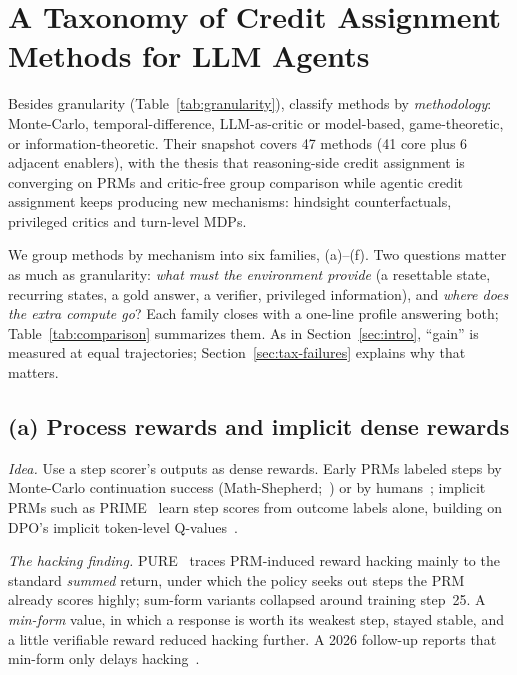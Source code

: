 \section{A Taxonomy of Credit Assignment Methods for LLM Agents}\label{sec:taxonomy}

Besides granularity (Table~\ref{tab:granularity}), \citet{zhang2026from} classify methods by \emph{methodology}: Monte-Carlo, temporal-difference, LLM-as-critic or model-based, game-theoretic, or information-theoretic. Their snapshot covers 47 methods (41 core plus 6 adjacent enablers), with the thesis that reasoning-side credit assignment is converging on PRMs and critic-free group comparison while agentic credit assignment keeps producing new mechanisms: hindsight counterfactuals, privileged critics and turn-level MDPs.

We group methods by mechanism into six families, (a)--(f). Two questions matter as much as granularity: \emph{what must the environment provide} (a resettable state, recurring states, a gold answer, a verifier, privileged information), and \emph{where does the extra compute go}? Each family closes with a one-line profile answering both; Table~\ref{tab:comparison} summarizes them. As in Section~\ref{sec:intro}, ``gain'' is measured at equal trajectories; Section~\ref{sec:tax-failures} explains why that matters.

\subsection{(a) Process rewards and implicit dense rewards}\label{sec:tax-prm}

\emph{Idea.} Use a step scorer's outputs as dense rewards. Early PRMs labeled steps by Monte-Carlo continuation success (Math-Shepherd;~\citealp{wang2024math}\unverified) or by humans~\citep{lightman2023lets}\unverified; implicit PRMs such as PRIME~\citep{cui2025process}\unverified{} learn step scores from outcome labels alone, building on DPO's implicit token-level Q-values~\citep{rafailov2024from}\unverified.

\emph{The hacking finding.} PURE~\citep{cheng2025stop} traces PRM-induced reward hacking mainly to the standard \emph{summed} return, under which the policy seeks out steps the PRM already scores highly; sum-form variants collapsed around training step~25. A \emph{min-form} value, in which a response is worth its weakest step, stayed stable, and a little verifiable reward reduced hacking further. A 2026 follow-up reports that min-form only delays hacking~\citep{uprm2026unsupervised}\unverified.

